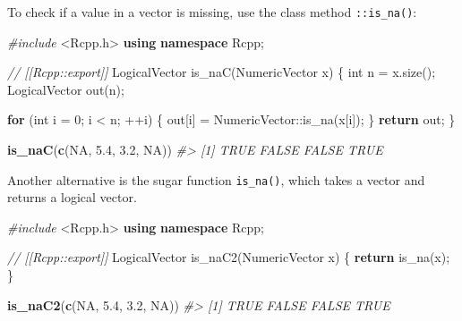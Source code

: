 \documentclass[]{book}
\newenvironment{Shaded}{\begin{snugshade}}{\end{snugshade}}
\newcommand{\CommentTok}[1]{\textcolor[rgb]{0.37,0.37,0.37}{\textit{#1}}}
\newcommand{\ControlFlowTok}[1]{\textcolor[rgb]{0.27,0.27,0.27}{\textbf{#1}}}
\newcommand{\DataTypeTok}[1]{\textcolor[rgb]{0.27,0.27,0.27}{#1}}
\newcommand{\DecValTok}[1]{\textcolor[rgb]{0.06,0.06,0.06}{#1}}
\newcommand{\FloatTok}[1]{\textcolor[rgb]{0.06,0.06,0.06}{#1}}
\newcommand{\ImportTok}[1]{#1}
\newcommand{\KeywordTok}[1]{\textcolor[rgb]{0.27,0.27,0.27}{\textbf{#1}}}
\newcommand{\NormalTok}[1]{#1}
\newcommand{\OtherTok}[1]{\textcolor[rgb]{0.37,0.37,0.37}{#1}}
\newcommand{\PreprocessorTok}[1]{\textcolor[rgb]{0.37,0.37,0.37}{\textit{#1}}}
\begin{document}
To check if a value in a vector is missing, use the class method \texttt{::is\_na()}:

\begin{Shaded}
\begin{Highlighting}[]
\PreprocessorTok{#include }\ImportTok{<Rcpp.h>}
\KeywordTok{using} \KeywordTok{namespace}\NormalTok{ Rcpp;}

\CommentTok{// [[Rcpp::export]]}
\NormalTok{LogicalVector is_naC(NumericVector x) \{}
  \DataTypeTok{int}\NormalTok{ n = x.size();}
\NormalTok{  LogicalVector out(n);}

  \ControlFlowTok{for}\NormalTok{ (}\DataTypeTok{int}\NormalTok{ i = }\DecValTok{0}\NormalTok{; i < n; ++i) \{}
\NormalTok{    out[i] = NumericVector::is_na(x[i]);}
\NormalTok{  \}}
  \ControlFlowTok{return}\NormalTok{ out;}
\NormalTok{\}}
\end{Highlighting}
\end{Shaded}

\begin{Shaded}
\begin{Highlighting}[]
\KeywordTok{is_naC}\NormalTok{(}\KeywordTok{c}\NormalTok{(}\OtherTok{NA}\NormalTok{, }\FloatTok{5.4}\NormalTok{, }\FloatTok{3.2}\NormalTok{, }\OtherTok{NA}\NormalTok{))}
\CommentTok{#> [1]  TRUE FALSE FALSE  TRUE}
\end{Highlighting}
\end{Shaded}

Another alternative is the sugar function \texttt{is\_na()}, which takes a vector and returns a logical vector.

\begin{Shaded}
\begin{Highlighting}[]
\PreprocessorTok{#include }\ImportTok{<Rcpp.h>}
\KeywordTok{using} \KeywordTok{namespace}\NormalTok{ Rcpp;}

\CommentTok{// [[Rcpp::export]]}
\NormalTok{LogicalVector is_naC2(NumericVector x) \{}
  \ControlFlowTok{return}\NormalTok{ is_na(x);}
\NormalTok{\}}
\end{Highlighting}
\end{Shaded}

\begin{Shaded}
\begin{Highlighting}[]
\KeywordTok{is_naC2}\NormalTok{(}\KeywordTok{c}\NormalTok{(}\OtherTok{NA}\NormalTok{, }\FloatTok{5.4}\NormalTok{, }\FloatTok{3.2}\NormalTok{, }\OtherTok{NA}\NormalTok{))}
\CommentTok{#> [1]  TRUE FALSE FALSE  TRUE}
\end{Highlighting}
\end{Shaded}
\end{document}

